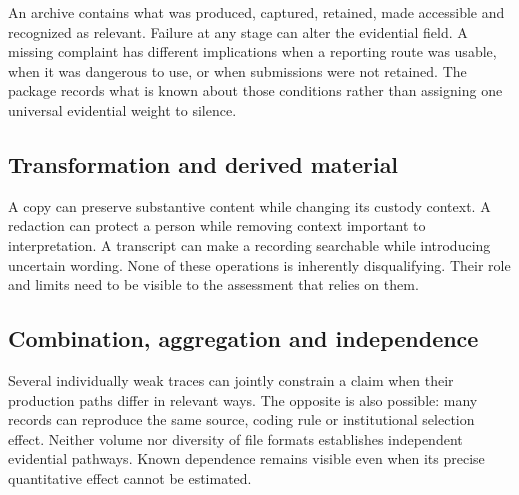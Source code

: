 \documentclass[11pt,a4paper]{article}
\begin{document}
An archive contains what was produced, captured, retained, made accessible and recognized as relevant. Failure at any stage can alter the evidential field. A missing complaint has different implications when a reporting route was usable, when it was dangerous to use, or when submissions were not retained. The package records what is known about those conditions rather than assigning one universal evidential weight to silence.

\subsection{Transformation and derived material}

A copy can preserve substantive content while changing its custody context. A redaction can protect a person while removing context important to interpretation. A transcript can make a recording searchable while introducing uncertain wording. None of these operations is inherently disqualifying. Their role and limits need to be visible to the assessment that relies on them.

\subsection{Combination, aggregation and independence}

Several individually weak traces can jointly constrain a claim when their production paths differ in relevant ways. The opposite is also possible: many records can reproduce the same source, coding rule or institutional selection effect. Neither volume nor diversity of file formats establishes independent evidential pathways. Known dependence remains visible even when its precise quantitative effect cannot be estimated.
\end{document}
